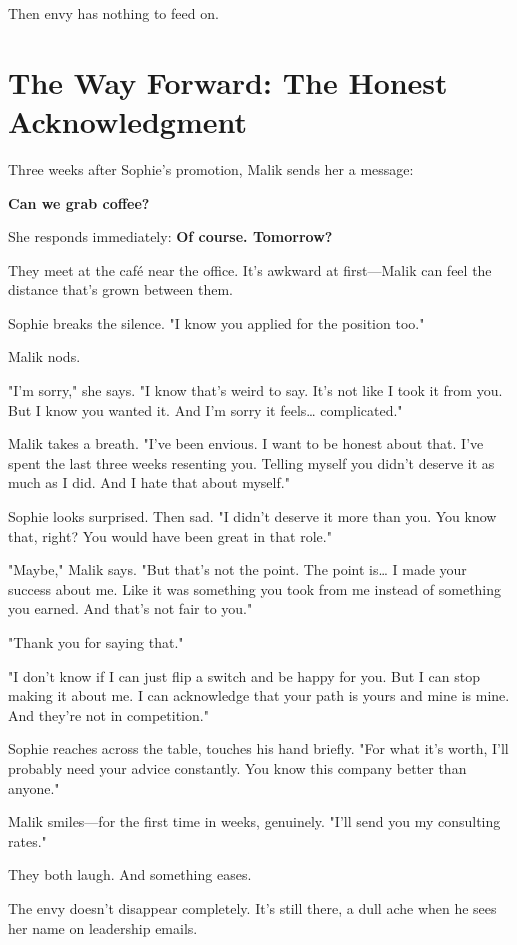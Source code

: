 \documentclass[11pt,twoside]{book}
\begin{document}
Then envy has nothing to feed on.

\section*{The Way Forward: The Honest Acknowledgment}

Three weeks after Sophie's promotion, Malik sends her a message:

\textbf{Can we grab coffee?}

She responds immediately: \textbf{Of course. Tomorrow?}

They meet at the café near the office. It's awkward at first—Malik can feel the distance that's grown between them.

Sophie breaks the silence. "I know you applied for the position too."

Malik nods.

"I'm sorry," she says. "I know that's weird to say. It's not like I took it from you. But I know you wanted it. And I'm sorry it feels\ldots{} complicated."

Malik takes a breath. "I've been envious. I want to be honest about that. I've spent the last three weeks resenting you. Telling myself you didn't deserve it as much as I did. And I hate that about myself."

Sophie looks surprised. Then sad. "I didn't deserve it more than you. You know that, right? You would have been great in that role."

"Maybe," Malik says. "But that's not the point. The point is\ldots{} I made your success about me. Like it was something you took from me instead of something you earned. And that's not fair to you."

"Thank you for saying that."

"I don't know if I can just flip a switch and be happy for you. But I can stop making it about me. I can acknowledge that your path is yours and mine is mine. And they're not in competition."

Sophie reaches across the table, touches his hand briefly. "For what it's worth, I'll probably need your advice constantly. You know this company better than anyone."

Malik smiles—for the first time in weeks, genuinely. "I'll send you my consulting rates."

They both laugh. And something eases.

The envy doesn't disappear completely. It's still there, a dull ache when he sees her name on leadership emails.
\end{document}
